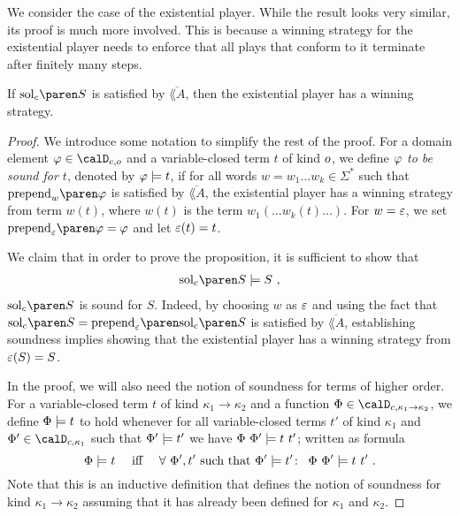 \documentclass[../../diss.tex]{subfiles}
\begin{document}
We consider the case of the existential player.
While the result looks very similar, its proof is much more involved.
This is because a winning strategy for the existential player needs to enforce that all plays that conform to it terminate after finitely many steps.

\begin{proposition}%
\label{Proposition:HORSConcreteSolExistential}%
    If $\solc{S}$ is satisfied by $\overline{\lang{A}}$, then the existential player has a winning strategy.
\end{proposition}

\begin{proof}
    We introduce some notation to simplify the rest of the proof.
    For a domain element
    $\judgmentground \in \domainc{\ground}$
    and a variable-closed term $t$ of kind $o$, we define \emph{$\varphi$ to be sound for $t$}, denoted by $\varphi \models t$, if for all words $w = w_1 \ldots w_k \in \Sigma^*$ such that
    $\prepend{w}{\judgmentground}$
    is satisfied by $\overline{\lang{A}}$, the existential player has a winning strategy from term $w(t)$, where $w(t)$ is the term $w_1 ( \ldots w_k (t) \ldots )$.
    For $w=\varepsilon$, we set $\prepend{\eps}{\judgmentground}=\judgmentground$ and let $\varepsilon(t)=t$.

    We claim that in order to prove the proposition, it is sufficient to show that
    \begin{align*}
        \solc{S} \gamesound S
        \ ,
    \end{align*}
    \ie $\solc{S}$ is sound for $S$.
    Indeed, by choosing $w$ as $\varepsilon$ and using the fact that $\solc{S} =  \prepend{\eps}{\solc{S}}$ is satisfied by $\overline{\lang{A}}$, establishing soundness implies showing that the existential player has a winning strategy from $\varepsilon(S) = S$.

    In the proof, we will also need the notion of soundness for terms of higher order.
    For a variable-closed term $t$ of kind
    $\kappa_1 \to \kappa_2$
    and a function
    $\judgment \in \domainc{\kappa_1 \to \kappa_2}$,
    we define
    $\Phi \models t$
    to hold whenever for all variable-closed terms $t'$ of kind $\kappa_1$ and
    $\judgment' \in \domainc{\kappa_1}$
    such that
    $\Phi' \models t'$
    we have
    $\Phi \  \Phi' \models t \  t'$;
     written as formula
    \[
        \Phi \models t
        \quad
        {\text{ iff }}
        \quad
        \forall \  \Phi', t'
            \text{ such that }
            \Phi' \models t' \colon
            \enspace
                \Phi \  \Phi' \models t \  t'
        \ .
    \]
    Note that this is an inductive definition that defines the notion of soundness for kind $\kappa_1 \to \kappa_2$ assuming that it has already been defined for $\kappa_1$ and $\kappa_2$.


\end{proof}
\end{document}
